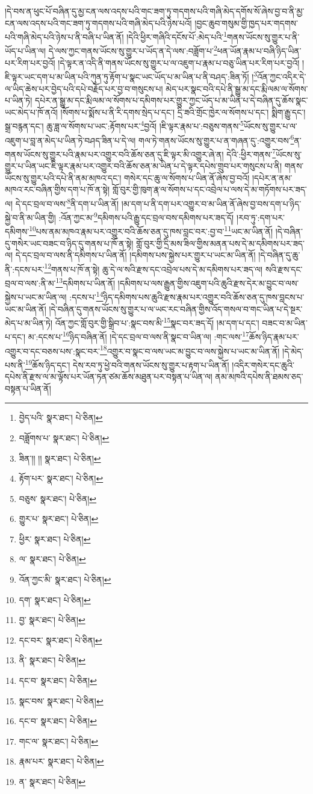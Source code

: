 །དེ་བས་ན་ཕུང་པོ་བཞིན་དུ་མྱ་ངན་ལས་འདས་པའི་གང་ཟག་ཏུ་གདགས་པའི་གཞི་མེད་དགོས་སོ་ཞེས་བྱ་བ་ནི་མྱ་ངན་ལས་འདས་པའི་གང་ཟག་ཏུ་གདགས་པའི་གཞི་མེད་པའི་ཉེས་པའོ། །བྱང་ཆུབ་གསུམ་གྱི་ཁྱད་པར་གདགས་པའི་གཞི་མེད་པའི་ཉེས་པ་ནི་བཞི་པ་ཡིན་ནོ། །དེའི་ཕྱིར་གཞིའི་དངོས་པོ་:མེད་པའི་\footnote{བྱེད་པའི་  སྣར་ཐང་།  པེ་ཅིན། }གནས་ཡོངས་སུ་གྱུར་པ་ནི་ཡོད་པ་ཡིན་ལ། དེ་ལས་ཀྱང་གནས་ཡོངས་སུ་གྱུར་པ་ཡོད་ན་དེ་ལས་:བཟློག་པ་\footnote{བཟློགས་པ་  སྣར་ཐང་།  པེ་ཅིན། }ཕན་ཡོན་རྣམ་པ་བཞི་ཉིད་ཡིན་པར་རིག་པར་བྱའོ། །དེ་ལྟར་ན་འདི་ནི་གནས་ཡོངས་སུ་གྱུར་པ་ལ་འཇུག་པ་རྣམ་པ་བཅུ་ཡིན་པར་རིག་པར་བྱའོ། །ཇི་ལྟར་ཡང་དག་པ་མ་ཡིན་པའི་ཀུན་ཏུ་རྟོག་པ་སྣང་ཡང་ཡོད་པ་མ་ཡིན་པ་ནི་བཤད་:ཟིན་ཏོ། །\footnote{ཟིན་།། །།  སྣར་ཐང་།  པེ་ཅིན། }འོན་ཀྱང་འདིར་དེ་ལ་ཡིད་ཆེས་པར་བྱེད་པའི་དཔེ་བརྗོད་པར་བྱ་བ་གསུངས་པ། མེད་པར་སྣང་བའི་དཔེ་ནི་སྒྱུ་མ་དང་རྨི་ལམ་ལ་སོགས་པ་ཡིན་ཏེ། དཔེར་ན་སྒྱུ་མ་དང་རྨི་ལམ་ལ་སོགས་པ་དམིགས་པར་གྱུར་ཀྱང་ཡོད་པ་མ་ཡིན་པ་དེ་བཞིན་དུ་ཆོས་སྣང་ཡང་མེད་པ་ཁོ་ནའོ། །སོགས་པ་སྨོས་པ་ནི་རི་དགས་སྲེད་པ་དང་། དྲི་ཟའི་གྲོང་ཁྱེར་ལ་སོགས་པ་དང་། སྨིག་རྒྱུ་དང་། སྒྲ་བརྙན་དང་། ཆུ་ཟླ་ལ་སོགས་པ་ཡང་:རྟོགས་པར་\footnote{རྟོག་པར་  སྣར་ཐང་།  པེ་ཅིན། }བྱའོ། །ཇི་ལྟར་རྣམ་པ་:བཅུས་གནས་\footnote{བཅུས་  སྣར་ཐང་།  པེ་ཅིན། }ཡོངས་སུ་གྱུར་པ་ལ་འཇུག་པ་བླ་ན་མེད་པ་ཡིན་ཏེ་བཤད་ཟིན་པ་དེ་ལ། གལ་ཏེ་གནས་ཡོངས་སུ་གྱུར་པ་ན་གཞན་དུ་:འགྱུར་བས་\footnote{གྱུར་པ་  སྣར་ཐང་།  པེ་ཅིན། }ན་གནས་ཡོངས་སུ་གྱུར་པའི་རྣམ་པར་འགྱུར་བའི་ཆོས་ཅན་དུ་ཇི་ལྟར་མི་འགྱུར་ཞེ་ན། དེའི་:ཕྱིར་གནས་\footnote{ཕྱིར་  སྣར་ཐང་།  པེ་ཅིན། }ཡོངས་སུ་གྱུར་པ་ཡིན་ཡང་ཇི་ལྟར་རྣམ་པར་འགྱུར་བའི་ཆོས་ཅན་མ་ཡིན་པ་དེ་ལྟར་དཔེས་གྲུབ་པར་གསུངས་པ་ནི། གནས་ཡོངས་སུ་གྱུར་པའི་དཔེ་ནི་ནམ་མཁའ་དང་། གསེར་དང་ཆུ་ལ་སོགས་པ་ཡིན་ནོ་ཞེས་བྱ་བའོ། །དཔེར་ན་ནམ་མཁའ་རང་བཞིན་གྱིས་དག་པ་ཁོ་ན་སྟེ། གློ་བུར་གྱི་ཁུག་རྣ་ལ་སོགས་པ་དང་འབྲེལ་པ་ལས་དེ་མ་གཏོགས་པར་ཟད་ལ། དེ་དང་བྲལ་བ་ལས་\footnote{ལ་  སྣར་ཐང་།  པེ་ཅིན། }ནི་དག་པ་ཡིན་ནོ། །མ་དག་པ་ནི་དག་པར་འགྱུར་བ་མ་ཡིན་ནོ་ཞེས་བྱ་བས་དག་པ་ཉིད་སྐྱེ་བ་ནི་མ་ཡིན་གྱི། :འོན་ཀྱང་མ་\footnote{འོན་ཀྱང་མི་  སྣར་ཐང་།  པེ་ཅིན། }དམིགས་པའི་རྒྱུ་དང་བྲལ་བས་དམིགས་པར་ཟད་དོ། །རབ་ཏུ་:དག་པར་དམིགས་\footnote{དག་  སྣར་ཐང་།  པེ་ཅིན། }པས་ནམ་མཁའ་རྣམ་པར་འགྱུར་བའི་ཆོས་ཅན་དུ་ཁས་བླང་བར་:བྱ་བ་\footnote{བྱ་  སྣར་ཐང་།  པེ་ཅིན། }ཡང་མ་ཡིན་ནོ། །དེ་བཞིན་དུ་གསེར་ཡང་བཟང་བ་ཉིད་དུ་གནས་པ་ཁོ་ན་སྟེ། གློ་བུར་གྱི་དྲི་མས་ཟིལ་གྱིས་མནན་པས་དེ་མ་དམིགས་པར་ཟད་ལ། དེ་དང་བྲལ་བ་ལས་ནི་དམིགས་པ་ཡིན་ནོ། །དམིགས་པས་སྐྱེས་པར་གྱུར་པ་ཡང་མ་ཡིན་ནོ། །དེ་བཞིན་དུ་ཆུ་ནི་:དངས་པར་\footnote{དང་བར་  སྣར་ཐང་།  པེ་ཅིན། }གནས་པ་ཁོ་ན་སྟེ། ཆུ་དེ་ལ་སའི་རྫས་དང་འབྲེལ་པས་དེ་མ་དམིགས་པར་ཟད་ལ། སའི་རྫས་དང་བྲལ་བ་ལས་:ནི་མ་\footnote{ནི་  སྣར་ཐང་།  པེ་ཅིན། }དམིགས་པ་ཡིན་ནོ། །དམིགས་པ་ལས་རྒྱུན་གྱིས་འཇུག་པའི་ཆུའི་རྫས་དེར་མ་བྱུང་བ་ལས་སྐྱེས་པ་ཡང་མ་ཡིན་ལ། :དངས་པ་\footnote{དང་བ་  སྣར་ཐང་།  པེ་ཅིན། }ཉིད་དམིགས་པས་ཆུའི་རྫས་རྣམ་པར་འགྱུར་བའི་ཆོས་ཅན་དུ་ཁས་བླངས་པ་ཡང་མ་ཡིན་ནོ། །དེ་བཞིན་དུ་གནས་ཡོངས་སུ་གྱུར་པ་ལ་ཡང་རང་བཞིན་གྱིས་འོད་གསལ་བ་གང་ཡིན་པ་དེ་སྔར་མེད་པ་མ་ཡིན་ཏེ། འོན་ཀྱང་གློ་བུར་གྱི་སྒྲིབ་པ་:སྣང་བས་མི་\footnote{སྣང་བས་  སྣར་ཐང་།  པེ་ཅིན། }སྣང་བར་ཟད་དོ། །མ་དག་པ་དང་། བཟང་བ་མ་ཡིན་པ་དང་། མ་:དངས་པ་\footnote{དང་བ་  སྣར་ཐང་།  པེ་ཅིན། }ཉིད་བཞིན་ནོ། །དེ་དང་བྲལ་བ་ལས་ནི་སྣང་བ་ཡིན་ལ། :གང་ལས་\footnote{གང་ལ་  སྣར་ཐང་།  པེ་ཅིན། }ཆོས་ཉིད་རྣམ་པར་འགྱུར་བ་དང་བཅས་པས་:སྣང་བར་\footnote{རྣམ་པར་  སྣར་ཐང་།  པེ་ཅིན། }འགྱུར་བ་སྣང་བ་ལས་ཡང་མ་བྱུང་བ་ལས་སྐྱེས་པ་ཡང་མ་ཡིན་ནོ། །དེ་མེད་པས་ནི་\footnote{ན་  སྣར་ཐང་།  པེ་ཅིན། }ཆོས་ཉིད་དང་། དེས་རབ་ཏུ་ཕྱེ་བའི་གནས་ཡོངས་སུ་གྱུར་པ་རྟག་པ་ཡིན་ནོ། །འདིར་གསེར་དང་ཆུའི་དཔེས་ནི་རྫས་ལ་མ་ལྟོས་པར་ཡོན་ཏན་ཙམ་ཆོས་མཐུན་པར་བསྟན་པ་ཡིན་ལ། ནམ་མཁའི་དཔེས་ནི་ཐམས་ཅད་བསྟན་པ་ཡིན་ནོ། 